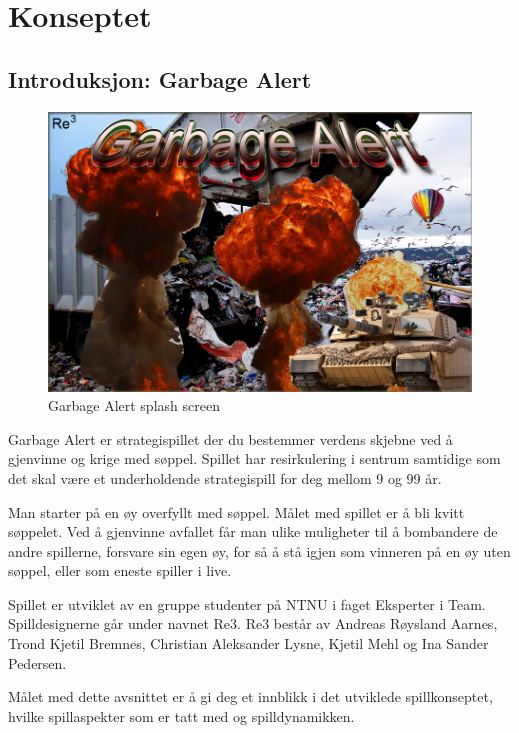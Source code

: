 \section{Konseptet}\label{sec:konsept}

\subsection{Introduksjon: Garbage Alert}

			\begin{figure} [here]
				\begin{center}
					\includegraphics[scale=0.5]{images/splashscreen}
				\end{center}
			\caption{Garbage Alert splash screen}
		\end{figure}

Garbage Alert er strategispillet der du bestemmer verdens skjebne ved å gjenvinne og krige med søppel. Spillet har resirkulering i sentrum samtidige som det skal være et underholdende strategispill for deg mellom 9 og 99 år. 

Man starter på en øy overfyllt med søppel. Målet med spillet er å bli kvitt søppelet. Ved å gjenvinne avfallet får man ulike muligheter til å bombandere de andre spillerne, forsvare sin egen øy, for så å stå igjen som vinneren på en øy uten søppel, eller som eneste spiller i live.

Spillet er utviklet av en gruppe studenter på NTNU i faget Eksperter i Team. Spilldesignerne går under navnet Re3. Re3 består av Andreas Røysland Aarnes, Trond Kjetil Bremnes, Christian Aleksander Lysne, Kjetil Mehl og Ina Sander Pedersen.

Målet med dette avsnittet er å gi deg et innblikk i det utviklede spillkonseptet,
hvilke spillaspekter som er tatt med og spilldynamikken.

